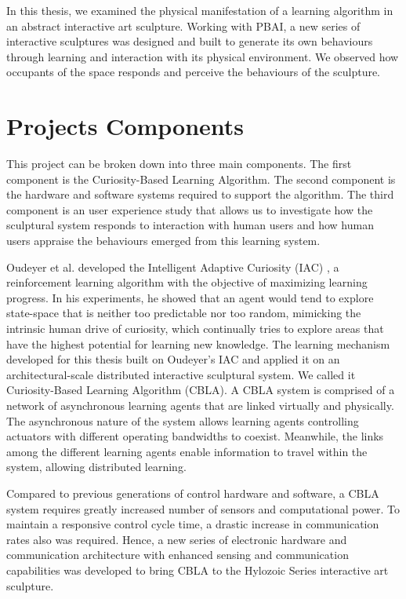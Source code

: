 In this thesis, we examined the physical manifestation of a learning algorithm in an abstract interactive art sculpture. Working with PBAI, a new series of interactive sculptures was designed and built to generate its own behaviours through learning and interaction with its physical environment. We observed how occupants of the space responds and perceive the behaviours of the sculpture. 

\section{Projects Components}

This project can be broken down into three main components. The first component is the Curiosity-Based Learning Algorithm. The second component is the hardware and software systems required to support the algorithm. The third component is an user experience study that allows us to investigate how the sculptural system responds to interaction with human users and how human users appraise the behaviours emerged from this learning system. 

Oudeyer et al. developed the Intelligent Adaptive Curiosity (IAC) \cite{Oudeyer2007}, a reinforcement learning algorithm with the objective of maximizing learning progress. In his experiments, he showed that an agent would tend to explore state-space that is neither too predictable nor too random, mimicking the intrinsic human drive of curiosity, which continually tries to explore areas that have the highest potential for learning new knowledge. The learning mechanism developed for this thesis built on Oudeyer's IAC and applied it on an architectural-scale distributed interactive sculptural system. We called it Curiosity-Based Learning Algorithm (CBLA). A CBLA system is comprised of a network of asynchronous learning agents that are linked virtually and physically. The asynchronous nature of the system allows learning agents controlling actuators with different operating bandwidths to coexist. Meanwhile, the links among the different learning agents enable information to travel within the system, allowing distributed learning.

Compared to previous generations of control hardware and software, a CBLA system requires greatly increased number of sensors and computational power. To maintain a responsive control cycle time, a drastic increase in communication rates also was required. Hence, a new series of electronic hardware and communication architecture with enhanced sensing and communication capabilities was developed to bring CBLA to the Hylozoic Series interactive art sculpture. 

